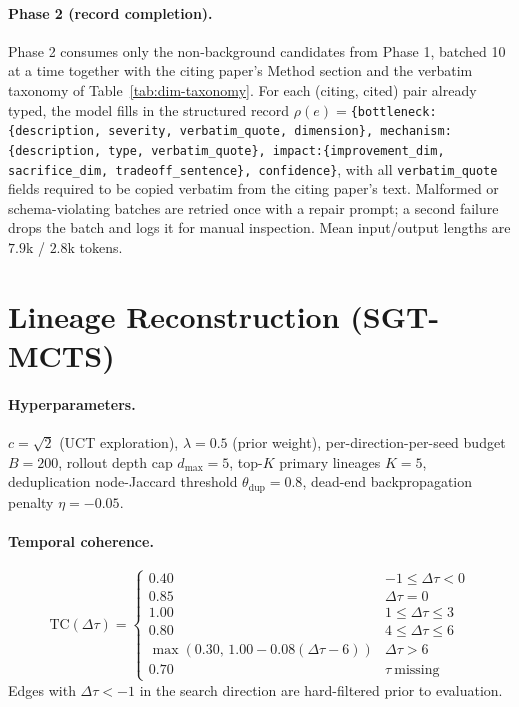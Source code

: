 \documentclass{llmxive}
\begin{document}
\paragraph{Phase 2 (record completion).}
Phase 2 consumes only the non-background candidates from Phase 1, batched 10 at a time together with the citing paper's Method section and the verbatim taxonomy of Table~\ref{tab:dim-taxonomy}. For each (citing, cited) pair already typed, the model fills in the structured record $\rho(e)=$\texttt{\{bottleneck:\{description, severity, verbatim\_quote, dimension\}, mechanism:\{description, type, verbatim\_quote\}, impact:\{improvement\_dim, sacrifice\_dim, tradeoff\_sentence\}, confidence\}}, with all \texttt{verbatim\_quote} fields required to be copied verbatim from the citing paper's text. Malformed or schema-violating batches are retried once with a repair prompt; a second failure drops the batch and logs it for manual inspection. Mean input/output lengths are $7.9$k / $2.8$k tokens.


\section{Lineage Reconstruction (SGT-MCTS)}
\label{app:mcts}

\paragraph{Hyperparameters.}
$c=\sqrt{2}$ (UCT exploration), $\lambda=0.5$ (prior weight), per-direction-per-seed budget $B=200$, rollout depth
cap $d_{\max}=5$, top-$K$ primary lineages $K=5$, deduplication node-Jaccard threshold $\theta_{\text{dup}}=0.8$,
dead-end backpropagation penalty $\eta=-0.05$.

\paragraph{Temporal coherence.}
\begin{equation}
\mathrm{TC}(\Delta\tau)=
\begin{cases}
0.40 & -1\le\Delta\tau<0 \\
0.85 & \Delta\tau=0 \\
1.00 & 1\le\Delta\tau\le3 \\
0.80 & 4\le\Delta\tau\le6 \\
\max(0.30,\,1.00-0.08(\Delta\tau-6)) & \Delta\tau>6 \\
0.70 & \tau\ \text{missing}
\end{cases}
\label{eq:tc}
\end{equation}
Edges with $\Delta\tau<-1$ in the search direction are hard-filtered prior to evaluation.
\end{document}

